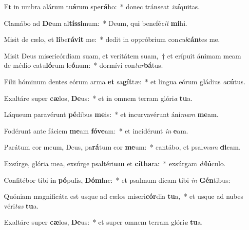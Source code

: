 \item Et in umbra alárum tu\textbf{á}rum spe\textbf{rá}bo:~* donec tránseat \textit{in}\textbf{í}quitas.
\item Clamábo ad \textbf{De}um al\textbf{tís}\textbf{si}mum:~* Deum, qui benefé\textit{cit} \textbf{mi}hi.
\item Misit de cælo, et \textbf{li}be\textbf{rá}\textbf{vit} me:~* dedit in oppróbrium con\textit{cul}\textbf{cán}tes me.
\item Misit Deus misericórdiam suam, et veritátem suam,~† et erípuit ánimam meam de médio catu\textbf{ló}rum le\textbf{ó}num:~* dormívi con\textit{tur}\textbf{bá}tus.
\item Fílii hóminum dentes eórum arma \textbf{et} sa\textbf{gít}tæ:~* et lingua eórum gládius \textit{a}\textbf{cú}tus.
\item Exaltáre super \textbf{cæ}los, \textbf{De}us:~* et in omnem terram glóri\textit{a} \textbf{tu}a.
\item Láqueum paravérunt \textbf{pé}dibus \textbf{me}is:~* et incurvavérunt áni\textit{mam} \textbf{me}am.
\item Fodérunt ante fáciem \textbf{me}am \textbf{fó}\textbf{ve}am:~* et incidérunt \textit{in} \textbf{e}am.
\item Parátum cor meum, Deus, pa\textbf{rá}tum cor \textbf{me}um:~* cantábo, et psal\textit{mum} \textbf{di}cam.
\item Exsúrge, glória mea, exsúrge psaltéri\textbf{um} et \textbf{cí}\textbf{tha}ra:~* exsúrgam \textit{di}\textbf{lú}culo.
\item Confitébor tibi in \textbf{pó}pulis, \textbf{Dó}\textbf{mi}ne:~* et psalmum dicam tibi \textit{in} \textbf{Gén}tibus:
\item Quóniam magnificáta est usque ad cælos miseri\textbf{cór}dia \textbf{tu}a,~* et usque ad nubes véri\textit{tas} \textbf{tu}a.
\item Exaltáre super \textbf{cæ}los, \textbf{De}us:~* et super omnem terram glóri\textit{a} \textbf{tu}a.
